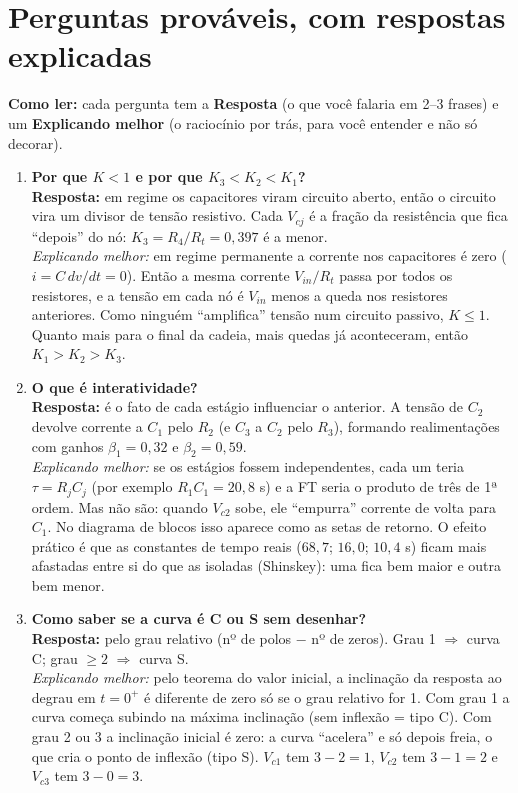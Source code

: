 \documentclass[11pt,a4paper]{article}
\newcommand{\Vc}[1]{V_{c#1}}
\newcommand{\Vin}{V_{in}}
\begin{document}
\section{Perguntas prováveis, com respostas explicadas}
\textbf{Como ler:} cada pergunta tem a \textbf{Resposta} (o que você falaria em 2--3 frases) e um \textbf{Explicando melhor} (o raciocínio por trás, para você entender e não só decorar).
\begin{enumerate}[leftmargin=*]
\item \textbf{Por que $K<1$ e por que $K_3<K_2<K_1$?}\\
\textbf{Resposta:} em regime os capacitores viram circuito aberto, então o circuito vira um divisor de tensão resistivo. Cada $V_{cj}$ é a fração da resistência que fica ``depois'' do nó: $K_3=R_4/R_t=0{,}397$ é a menor.\\
\emph{Explicando melhor:} em regime permanente a corrente nos capacitores é zero ($i=C\,dv/dt=0$). Então a mesma corrente $\Vin/R_t$ passa por todos os resistores, e a tensão em cada nó é $\Vin$ menos a queda nos resistores anteriores. Como ninguém ``amplifica'' tensão num circuito passivo, $K\le1$. Quanto mais para o final da cadeia, mais quedas já aconteceram, então $K_1>K_2>K_3$.
\item \textbf{O que é interatividade?}\\
\textbf{Resposta:} é o fato de cada estágio influenciar o anterior. A tensão de $C_2$ devolve corrente a $C_1$ pelo $R_2$ (e $C_3$ a $C_2$ pelo $R_3$), formando realimentações com ganhos $\beta_1=0{,}32$ e $\beta_2=0{,}59$.\\
\emph{Explicando melhor:} se os estágios fossem independentes, cada um teria $\tau=R_jC_j$ (por exemplo $R_1C_1=20{,}8$ s) e a FT seria o produto de três de 1ª ordem. Mas não são: quando $\Vc2$ sobe, ele ``empurra'' corrente de volta para $C_1$. No diagrama de blocos isso aparece como as setas de retorno. O efeito prático é que as constantes de tempo reais ($68{,}7$; $16{,}0$; $10{,}4$ s) ficam mais afastadas entre si do que as isoladas (Shinskey): uma fica bem maior e outra bem menor.
\item \textbf{Como saber se a curva é C ou S sem desenhar?}\\
\textbf{Resposta:} pelo grau relativo (nº de polos $-$ nº de zeros). Grau 1 $\Rightarrow$ curva C; grau $\ge2$ $\Rightarrow$ curva S.\\
\emph{Explicando melhor:} pelo teorema do valor inicial, a inclinação da resposta ao degrau em $t=0^+$ é diferente de zero só se o grau relativo for 1. Com grau 1 a curva começa subindo na máxima inclinação (sem inflexão = tipo C). Com grau 2 ou 3 a inclinação inicial é zero: a curva ``acelera'' e só depois freia, o que cria o ponto de inflexão (tipo S). $\Vc1$ tem $3-2=1$, $\Vc2$ tem $3-1=2$ e $\Vc3$ tem $3-0=3$.

\end{enumerate}
\end{document}
